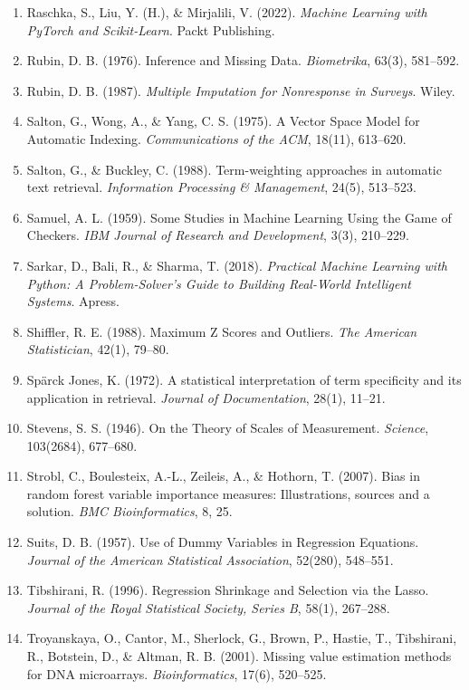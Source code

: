 \begin{enumerate}
    \item Raschka, S., Liu, Y. (H.), \& Mirjalili, V. (2022). \textit{Machine Learning with PyTorch and Scikit-Learn}. Packt Publishing.
    \item Rubin, D. B. (1976). Inference and Missing Data. \textit{Biometrika}, 63(3), 581--592.
    \item Rubin, D. B. (1987). \textit{Multiple Imputation for Nonresponse in Surveys}. Wiley.
    \item Salton, G., Wong, A., \& Yang, C. S. (1975). A Vector Space Model for Automatic Indexing. \textit{Communications of the ACM}, 18(11), 613--620.
    \item Salton, G., \& Buckley, C. (1988). Term-weighting approaches in automatic text retrieval. \textit{Information Processing \& Management}, 24(5), 513--523.
    \item Samuel, A. L. (1959). Some Studies in Machine Learning Using the Game of Checkers. \textit{IBM Journal of Research and Development}, 3(3), 210--229.
    \item Sarkar, D., Bali, R., \& Sharma, T. (2018). \textit{Practical Machine Learning with Python: A Problem-Solver's Guide to Building Real-World Intelligent Systems}. Apress.
    \item Shiffler, R. E. (1988). Maximum Z Scores and Outliers. \textit{The American Statistician}, 42(1), 79--80.
    \item Spärck Jones, K. (1972). A statistical interpretation of term specificity and its application in retrieval. \textit{Journal of Documentation}, 28(1), 11--21.
    \item Stevens, S. S. (1946). On the Theory of Scales of Measurement. \textit{Science}, 103(2684), 677--680.
    \item Strobl, C., Boulesteix, A.-L., Zeileis, A., \& Hothorn, T. (2007). Bias in random forest variable importance measures: Illustrations, sources and a solution. \textit{BMC Bioinformatics}, 8, 25.
    \item Suits, D. B. (1957). Use of Dummy Variables in Regression Equations. \textit{Journal of the American Statistical Association}, 52(280), 548--551.
    \item Tibshirani, R. (1996). Regression Shrinkage and Selection via the Lasso. \textit{Journal of the Royal Statistical Society, Series B}, 58(1), 267--288.
    \item Troyanskaya, O., Cantor, M., Sherlock, G., Brown, P., Hastie, T., Tibshirani, R., Botstein, D., \& Altman, R. B. (2001). Missing value estimation methods for DNA microarrays. \textit{Bioinformatics}, 17(6), 520--525.

\end{enumerate}
